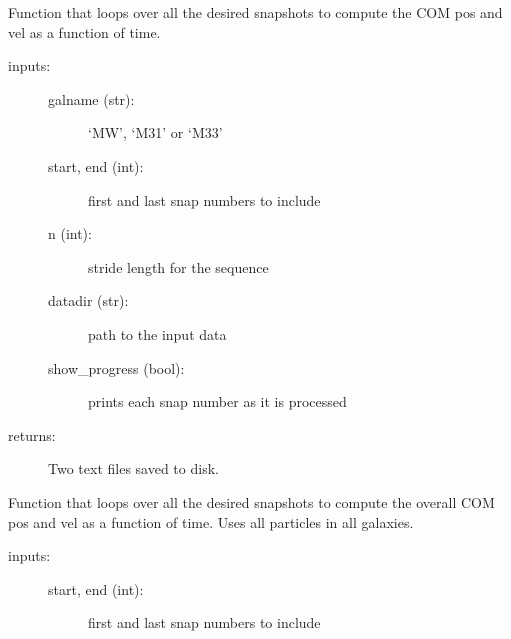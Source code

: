 \documentclass[letterpaper,10pt,english]{sphinxmanual}
\begin{document}
\begin{fulllineitems}
\begin{description}
\end{description}

\begin{fulllineitems}
\label{\detokenize{timecourse:galaxy.timecourse.TimeCourse.write_com_ang_mom}}
Function that loops over all the desired snapshots to compute the COM pos and vel as a 
function of time.
\begin{description}
\item[{inputs:}] \leavevmode\begin{description}
\item[{galname (str):}] \leavevmode
‘MW’, ‘M31’ or ‘M33’

\item[{start, end (int):}] \leavevmode
first and last snap numbers to include

\item[{n (int):}] \leavevmode
stride length for the sequence

\item[{datadir (str):}] \leavevmode
path to the input data

\item[{show\_progress (bool):}] \leavevmode
prints each snap number as it is processed

\end{description}

\item[{returns: }] \leavevmode
Two text files saved to disk.

\end{description}

\end{fulllineitems}


\begin{fulllineitems}
\label{\detokenize{timecourse:galaxy.timecourse.TimeCourse.write_total_com}}
Function that loops over all the desired snapshots to compute the overall COM 
pos and vel as a function of time. Uses all particles in all galaxies.
\begin{description}
\item[{inputs:}] \leavevmode\begin{description}
\item[{start, end (int):}] \leavevmode
first and last snap numbers to include


\end{description}
\end{description}
\end{fulllineitems}
\end{fulllineitems}
\end{document}
